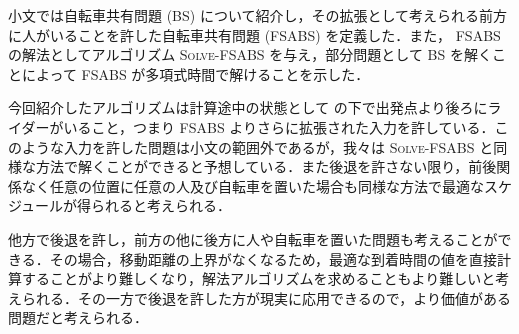 小文では自転車共有問題 (BS) について紹介し，その拡張として考えられる前方に人がいることを許した自転車共有問題 (FSABS) を定義した．また， FSABS の解法としてアルゴリズム \textsc{Solve-FSABS} を与え，部分問題として BS を解くことによって FSABS が多項式時間で解けることを示した．

今回紹介したアルゴリズムは計算途中の状態として  の下で出発点より後ろにライダーがいること，つまり FSABS よりさらに拡張された入力を許している．このような入力を許した問題は小文の範囲外であるが，我々は \textsc{Solve-FSABS} と同様な方法で解くことができると予想している．また後退を許さない限り，前後関係なく任意の位置に任意の人及び自転車を置いた場合も同様な方法で最適なスケジュールが得られると考えられる．

他方で後退を許し，前方の他に後方に人や自転車を置いた問題も考えることができる．その場合，移動距離の上界がなくなるため，最適な到着時間の値を直接計算することがより難しくなり，解法アルゴリズムを求めることもより難しいと考えられる．その一方で後退を許した方が現実に応用できるので，より価値がある問題だと考えられる．